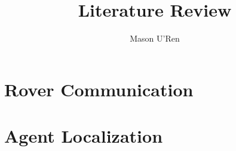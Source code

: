 \documentclass[]{article}
\title{Literature Review}
\author{Mason U'Ren}
\begin{document}
\maketitle

\section{Rover Communication}


\section{Agent Localization}





\end{document}
